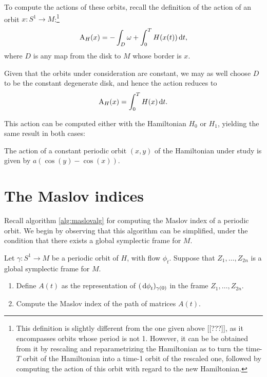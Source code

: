 To compute the actions of these orbits, recall the definition of the action of an orbit $x \colon S^1 \to M$:\footnote{This definition is slightly different from the one given above [[???]], as it encompasses orbits whose period is not 1. However, it can be be obtained from it by rescaling and reparametrizing the Hamiltonian as to turn the time-$T$ orbit of the Hamiltonian into a time-1 orbit of the rescaled one, followed by computing the action of this orbit with regard to the new Hamiltonian.}
\begin{equation}
\AA_{H}(x) = - \int_D \omega + \int_0^T H(x(t)) \dl t,
\end{equation}
where $D$ is any map from the disk to $M$ whose border is $x$.

Given that the orbits under consideration are constant, we may as well choose $D$ to be the constant degenerate disk, and hence the action reduces to
\begin{equation}
\AA_H(x) = \int_0^T H(x) \dl t.
\end{equation}

This action can be computed either with the Hamiltonian $H_0$ or $H_1$, yielding the same result in both cases:
\begin{prop}
The action of a constant periodic orbit $(x,y)$ of the Hamiltonian under study is given by $a (\cos(y) - \cos(x))$.
\end{prop}

\section{The Maslov indices}

Recall algorithm \ref{alg:maslovalg} for computing the Maslov index of a periodic orbit. We begin by observing that this algorithm can be simplified, under the condition that there exists a global symplectic frame for $M$.

\begin{algorithm}
Let $\gamma \colon S^1 \to M$ be a periodic orbit of $H$, with flow $\phi_t$. Suppose that $Z_1, \dots, Z_{2n}$ is a global symplectic frame for $M$.
\begin{enumerate}[algorithm]
\item Define $A(t)$ as the representation of $(\dl \phi_t)_{\gamma(0)}$ in the frame $Z_1, \dots, Z_{2n}$.
\item Compute the Maslov index of the path of matrices $A(t)$.
\end{enumerate}
\end{algorithm}

